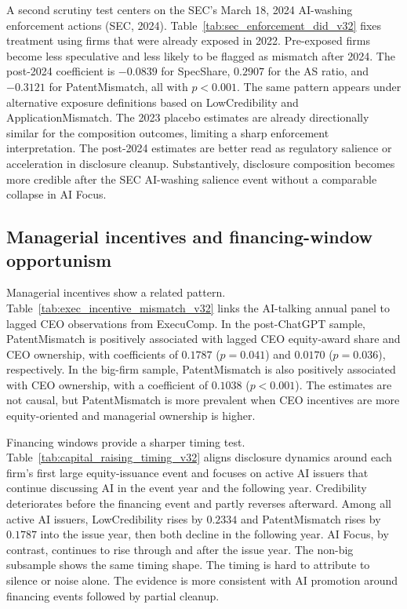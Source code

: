 A second scrutiny test centers on the SEC's March 18, 2024 AI-washing enforcement actions (SEC, 2024). Table~\ref{tab:sec_enforcement_did_v32} fixes treatment using firms that were already exposed in 2022. Pre-exposed firms become less speculative and less likely to be flagged as mismatch after 2024. The post-2024 coefficient is $-0.0839$ for SpecShare, $0.2907$ for the AS ratio, and $-0.3121$ for PatentMismatch, all with $p<0.001$. The same pattern appears under alternative exposure definitions based on LowCredibility and ApplicationMismatch. The 2023 placebo estimates are already directionally similar for the composition outcomes, limiting a sharp enforcement interpretation. The post-2024 estimates are better read as regulatory salience or acceleration in disclosure cleanup. Substantively, disclosure composition becomes more credible after the SEC AI-washing salience event without a comparable collapse in AI Focus.



\subsection{Managerial incentives and financing-window opportunism}

Managerial incentives show a related pattern. Table~\ref{tab:exec_incentive_mismatch_v32} links the AI-talking annual panel to lagged CEO observations from ExecuComp. In the post-ChatGPT sample, PatentMismatch is positively associated with lagged CEO equity-award share and CEO ownership, with coefficients of $0.1787$ ($p=0.041$) and $0.0170$ ($p=0.036$), respectively. In the big-firm sample, PatentMismatch is also positively associated with CEO ownership, with a coefficient of $0.1038$ ($p<0.001$). The estimates are not causal, but PatentMismatch is more prevalent when CEO incentives are more equity-oriented and managerial ownership is higher.



Financing windows provide a sharper timing test. Table~\ref{tab:capital_raising_timing_v32} aligns disclosure dynamics around each firm's first large equity-issuance event and focuses on active AI issuers that continue discussing AI in the event year and the following year. Credibility deteriorates before the financing event and partly reverses afterward. Among all active AI issuers, LowCredibility rises by $0.2334$ and PatentMismatch rises by $0.1787$ into the issue year, then both decline in the following year. AI Focus, by contrast, continues to rise through and after the issue year. The non-big subsample shows the same timing shape. The timing is hard to attribute to silence or noise alone. The evidence is more consistent with AI promotion around financing events followed by partial cleanup.

